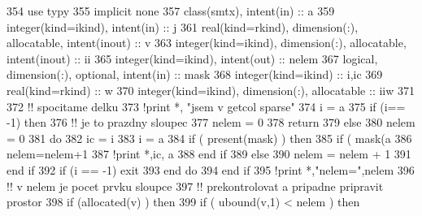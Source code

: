 \begin{DoxyCode}
354         \textcolor{keywordtype}{use }typy
355         \textcolor{keywordtype}{implicit none}
357         \textcolor{keywordtype}{class}(smtx), \textcolor{keywordtype}{intent(in)} :: a
359         \textcolor{keywordtype}{integer(kind=ikind)}, \textcolor{keywordtype}{intent(in)} :: j
361         \textcolor{keywordtype}{real(kind=rkind)}, \textcolor{keywordtype}{dimension(:)}, \textcolor{keywordtype}{allocatable}, \textcolor{keywordtype}{intent(inout)} :: v
363         \textcolor{keywordtype}{integer(kind=ikind)}, \textcolor{keywordtype}{dimension(:)}, \textcolor{keywordtype}{allocatable}, \textcolor{keywordtype}{intent(inout)} :: ii
365         \textcolor{keywordtype}{integer(kind=ikind)}, \textcolor{keywordtype}{intent(out)} :: nelem
367         \textcolor{keywordtype}{logical}, \textcolor{keywordtype}{dimension(:)}, \textcolor{keywordtype}{optional}, \textcolor{keywordtype}{intent(in)} :: mask
368         \textcolor{keywordtype}{integer(kind=ikind)} :: i,ic
369         \textcolor{keywordtype}{real(kind=rkind)} :: w
370         \textcolor{keywordtype}{integer(kind=ikind)}, \textcolor{keywordtype}{dimension(:)}, \textcolor{keywordtype}{allocatable} :: iiw
371 
372         \textcolor{comment}{!! spocitame delku
}
373         \textcolor{comment}{!print *, "jsem v getcol sparse"
}
374         i = a%
375         \textcolor{keywordflow}{if} (i== -1) then
376             \textcolor{comment}{!! je to prazdny sloupec
}
377             nelem = 0
378             return
379         else
380             nelem = 0
381             do
382                 ic = i
383                 i = a%
384                 \textcolor{keywordflow}{if} ( \textcolor{keyword}{present}(mask) ) then
385                     \textcolor{keywordflow}{if} ( mask(a%
386                         nelem=nelem+1
387                         \textcolor{comment}{!print *,ic, a%
}
388 \textcolor{keyword}{                    end }if
389                 else
390                     nelem = nelem + 1
391 \textcolor{keyword}{                end }if
392                 \textcolor{keywordflow}{if} (i == -1) exit
393 \textcolor{keyword}{            end }do
394 \textcolor{keyword}{        end }if
395         \textcolor{comment}{!print *,"nelem=",nelem
}
396         \textcolor{comment}{!! v nelem je pocet prvku sloupce
}
397         \textcolor{comment}{!! prekontrolovat a pripadne pripravit prostor
}
398         \textcolor{keywordflow}{if} (\textcolor{keyword}{allocated}(v) ) then
399             \textcolor{keywordflow}{if} ( ubound(v,1) < nelem ) then

\end{DoxyCode}
